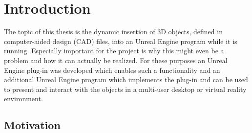 \chapter{Introduction}
The topic of this thesis is the dynamic insertion of 3D objects, defined in computer-aided design (\acs{CAD}) files, into an Unreal Engine program while it is running. Especially important for the project is why this might even be a problem and how it can actually be realized. For these purposes an Unreal Engine plug-in was developed which enables such a functionality and an additional Unreal Engine program which implements the plug-in and can be used to present and interact with the objects in a multi-user desktop or virtual reality environment.

\section{Motivation}

